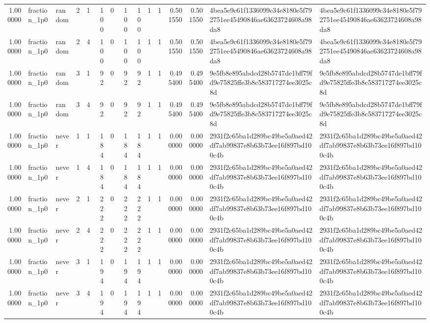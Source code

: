 \begin{tabular}{rllrrrrrrrrrrll}
1.000000 & fraction\_1p0 & random & 2 & 1 & 100 & 0 & 100 & 100 & 1 & 1 & 0.501550 & 0.501550 & 4bea5e9c61f1336099c34e8180e5f792751ee45490846ae63623724608a98da8 & 4bea5e9c61f1336099c34e8180e5f792751ee45490846ae63623724608a98da8 \\
1.000000 & fraction\_1p0 & random & 2 & 4 & 100 & 0 & 100 & 100 & 1 & 1 & 0.501550 & 0.501550 & 4bea5e9c61f1336099c34e8180e5f792751ee45490846ae63623724608a98da8 & 4bea5e9c61f1336099c34e8180e5f792751ee45490846ae63623724608a98da8 \\
1.000000 & fraction\_1p0 & random & 3 & 1 & 92 & 0 & 92 & 92 & 1 & 1 & 0.495400 & 0.495400 & 9e5fb8e895abdcd28b5747de1bff79fd9e75825ffe3b8c583717274ee3025c8d & 9e5fb8e895abdcd28b5747de1bff79fd9e75825ffe3b8c583717274ee3025c8d \\
1.000000 & fraction\_1p0 & random & 3 & 4 & 92 & 0 & 92 & 92 & 1 & 1 & 0.495400 & 0.495400 & 9e5fb8e895abdcd28b5747de1bff79fd9e75825ffe3b8c583717274ee3025c8d & 9e5fb8e895abdcd28b5747de1bff79fd9e75825ffe3b8c583717274ee3025c8d \\
1.000000 & fraction\_1p0 & never & 1 & 1 & 184 & 0 & 184 & 184 & 1 & 1 & 0.000000 & 0.000000 & 2931f2c65ba1d289bc49be5a0aed42df7ab99837e8b63b73ee16f897bd100c4b & 2931f2c65ba1d289bc49be5a0aed42df7ab99837e8b63b73ee16f897bd100c4b \\
1.000000 & fraction\_1p0 & never & 1 & 4 & 184 & 0 & 184 & 184 & 1 & 1 & 0.000000 & 0.000000 & 2931f2c65ba1d289bc49be5a0aed42df7ab99837e8b63b73ee16f897bd100c4b & 2931f2c65ba1d289bc49be5a0aed42df7ab99837e8b63b73ee16f897bd100c4b \\
1.000000 & fraction\_1p0 & never & 2 & 1 & 222 & 0 & 222 & 222 & 1 & 1 & 0.000000 & 0.000000 & 2931f2c65ba1d289bc49be5a0aed42df7ab99837e8b63b73ee16f897bd100c4b & 2931f2c65ba1d289bc49be5a0aed42df7ab99837e8b63b73ee16f897bd100c4b \\
1.000000 & fraction\_1p0 & never & 2 & 4 & 222 & 0 & 222 & 222 & 1 & 1 & 0.000000 & 0.000000 & 2931f2c65ba1d289bc49be5a0aed42df7ab99837e8b63b73ee16f897bd100c4b & 2931f2c65ba1d289bc49be5a0aed42df7ab99837e8b63b73ee16f897bd100c4b \\
1.000000 & fraction\_1p0 & never & 3 & 1 & 194 & 0 & 194 & 194 & 1 & 1 & 0.000000 & 0.000000 & 2931f2c65ba1d289bc49be5a0aed42df7ab99837e8b63b73ee16f897bd100c4b & 2931f2c65ba1d289bc49be5a0aed42df7ab99837e8b63b73ee16f897bd100c4b \\
1.000000 & fraction\_1p0 & never & 3 & 4 & 194 & 0 & 194 & 194 & 1 & 1 & 0.000000 & 0.000000 & 2931f2c65ba1d289bc49be5a0aed42df7ab99837e8b63b73ee16f897bd100c4b & 2931f2c65ba1d289bc49be5a0aed42df7ab99837e8b63b73ee16f897bd100c4b \\
\bottomrule
\end{tabular}
